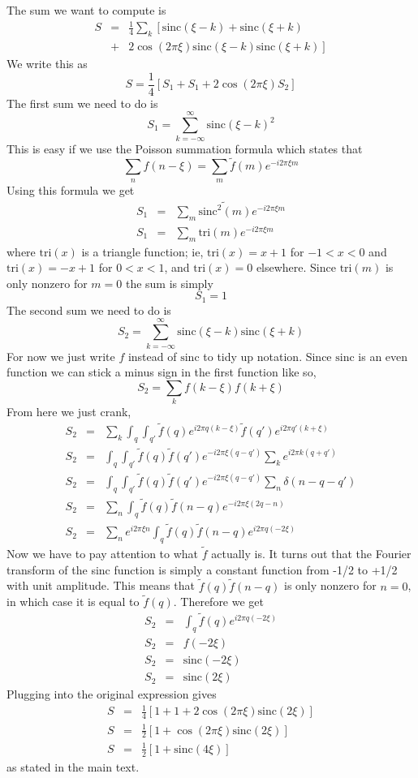 \documentclass[twocolumn]{article}
\begin{document}
The sum we want to compute is\begin{eqnarray*}
S & = & \frac{1}{4}\sum_{k}\left[\textrm{sinc}(\xi-k)+\textrm{sinc}(\xi+k)\right.\\
 & + & \left.2\cos(2\pi\xi)\textrm{sinc}(\xi-k)\textrm{sinc}(\xi+k)\right]\end{eqnarray*}
We write this as\[
S=\frac{1}{4}\left[S_{1}+S_{1}+2\cos(2\pi\xi)S_{2}\right]\]
The first sum we need to do is\[
S_{1}=\sum_{k=-\infty}^{\infty}\textrm{sinc}(\xi-k)^{2}\]
This is easy if we use the Poisson summation formula which states
that\[
\sum_{n}f(n-\xi)=\sum_{m}\tilde{f}(m)e^{-i2\pi\xi m}\]
Using this formula we get\begin{eqnarray*}
S_{1} & = & \sum_{m}\widetilde{\textrm{sinc}^{2}\left(m\right)}e^{-i2\pi\xi m}\\
S_{1} & = & \sum_{m}\textrm{tri}(m)e^{-i2\pi\xi m}\end{eqnarray*}
where $\textrm{tri}(x)$ is a triangle function; ie, $\textrm{tri}(x)=x+1$
for $-1<x<0$ and $\textrm{tri}(x)=-x+1$ for $0<x<1$, and $\textrm{tri}(x)=0$
elsewhere. Since $\textrm{tri}(m)$ is only nonzero for $m=0$ the
sum is simply\[
S_{1}=1\]
The second sum we need to do is\[
S_{2}=\sum_{k=-\infty}^{\infty}\textrm{sinc}(\xi-k)\textrm{sinc}(\xi+k)\]
For now we just write $f$ instead of $\textrm{sinc}$ to tidy up
notation. Since $\textrm{sinc}$ is an even function we can stick
a minus sign in the first function like so,\[
S_{2}=\sum_{k}f(k-\xi)f(k+\xi)\]
From here we just crank,\begin{eqnarray*}
S_{2} & = & \sum_{k}\int_{q}\int_{q'}\tilde{f}(q)e^{i2\pi q(k-\xi)}\tilde{f}(q')e^{i2\pi q'(k+\xi)}\\
S_{2} & = & \int_{q}\int_{q'}\tilde{f}(q)\tilde{f}(q')e^{-i2\pi\xi(q-q')}\sum_{k}e^{i2\pi k(q+q')}\\
S_{2} & = & \int_{q}\int_{q'}\tilde{f}(q)\tilde{f}(q')e^{-i2\pi\xi(q-q')}\sum_{n}\delta(n-q-q')\\
S_{2} & = & \sum_{n}\int_{q}\tilde{f}(q)\tilde{f}(n-q)e^{-i2\pi\xi(2q-n)}\\
S_{2} & = & \sum_{n}e^{i2\pi\xi n}\int_{q}\tilde{f}(q)\tilde{f}(n-q)e^{i2\pi q(-2\xi)}\end{eqnarray*}
Now we have to pay attention to what $\tilde{f}$ actually is. It
turns out that the Fourier transform of the sinc function is simply
a constant function from -1/2 to +1/2 with unit amplitude. This means
that $\tilde{f}(q)\tilde{f}(n-q)$ is only nonzero for $n=0$, in
which case it is equal to $\tilde{f}(q)$. Therefore we get\begin{eqnarray*}
S_{2} & = & \int_{q}\tilde{f}(q)e^{i2\pi q(-2\xi)}\\
S_{2} & = & f(-2\xi)\\
S_{2} & = & \textrm{sinc}(-2\xi)\\
S_{2} & = & \textrm{sinc}(2\xi)\end{eqnarray*}
Plugging into the original expression gives\begin{eqnarray*}
S & = & \frac{1}{4}\left[1+1+2\cos(2\pi\xi)\textrm{sinc}(2\xi)\right]\\
S & = & \frac{1}{2}\left[1+\cos(2\pi\xi)\textrm{sinc}(2\xi)\right]\\
S & = & \frac{1}{2}\left[1+\textrm{sinc}(4\xi)\right]\end{eqnarray*}
as stated in the main text.
\end{document}
